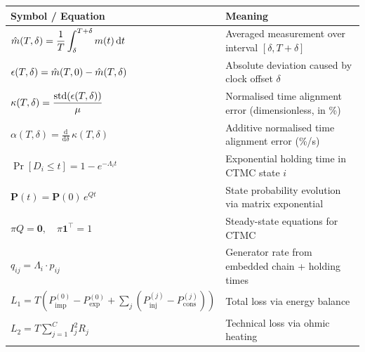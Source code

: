 \begin{center}
\renewcommand{\arraystretch}{2.0}
\begin{tabularx}{\textwidth}{@{} l X @{}}
\toprule
\textbf{Symbol / Equation} & \textbf{Meaning} \\
\midrule
$\displaystyle
  \hat{m}(T,\delta) = \frac{1}{T}\int_{\delta}^{T+\delta}m(t)\,\mathrm{d}t$
& Averaged measurement over interval $[\delta, T+\delta]$ \\
 
$\displaystyle
  \epsilon(T,\delta) = \hat{m}(T,0) - \hat{m}(T,\delta)$
& Absolute deviation caused by clock offset $\delta$ \\
 
$\displaystyle
  \kappa(T,\delta) = \frac{\mathrm{std}(\epsilon(T,\delta))}{\mu}$
& Normalised time alignment error (dimensionless, in \%) \\
 
$\displaystyle
  \alpha(T,\delta) = \frac{\mathrm{d}}{\mathrm{d}\delta}\,\kappa(T,\delta)$
& Additive normalised time alignment error (\%/s) \\
 
$\displaystyle
  \Pr[D_i \leq t] = 1 - e^{-\Lambda_i t}$
& Exponential holding time in CTMC state $i$ \\
 
$\displaystyle
  \mathbf{P}(t) = \mathbf{P}(0)\,e^{Qt}$
& State probability evolution via matrix exponential \\
 
$\displaystyle
  \pi Q = \mathbf{0},\quad \pi\mathbf{1}^\top = 1$
& Steady-state equations for CTMC \\
 
$\displaystyle
  q_{ij} = \Lambda_i \cdot p_{ij}$
& Generator rate from embedded chain + holding times \\
 
$\displaystyle
  L_1 = T\!\left(P^{(0)}_{\mathrm{imp}} - P^{(0)}_{\mathrm{exp}}
  + \sum_j(P^{(j)}_{\mathrm{inj}} - P^{(j)}_{\mathrm{cons}})\right)$
& Total loss via energy balance \\
 
$\displaystyle
  L_2 = T\sum_{j=1}^{C} I_j^2 R_j$
& Technical loss via ohmic heating \\
\bottomrule
\end{tabularx}
\end{center}

